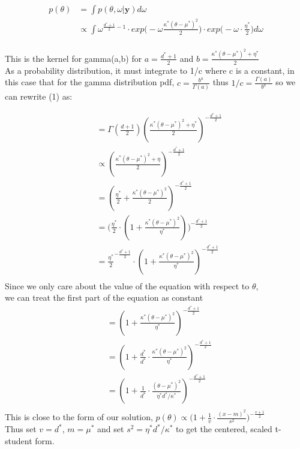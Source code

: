 \documentclass{homework}
\begin{document}
\begin{enumerate}[label=(\Alph*)]
\begin{equation} \begin{split}
p(\theta) & = \int p(\theta, \omega | \textbf{y}) d\omega \\
& \propto \int  \omega^{\frac{d^*+1}{2} - 1 } \cdot exp\big( -\omega \frac{\kappa^*(\theta - \mu^*)^2}{2} \big)  \cdot exp\big( -\omega \cdot \frac{\eta^*}{2}\big) d\omega \\
\end{split} \end{equation}

This is the kernel for gamma(a,b) for $a = \frac{d^* + 1}{2}$ and $b = \frac{\kappa^*(\theta - \mu^*)^2 + \eta^*}{2} $\\ As a probability distribution, it must integrate to 1/c where c is a constant, in this case that for the gamma distribution pdf, $c = \frac{b^a}{\Gamma(a)}$ thus $1/c  =   \frac{\Gamma(a)}{b^a}$ so we can rewrite (1) as:

\begin{equation} \begin{split}
& = \Gamma(\frac{d+1}{2})( \frac{\kappa^*(\theta - \mu^*)^2 + \eta^*}{2} )^{-\frac{d^*+1}{2}} \\
& \propto ( \frac{\kappa^*(\theta - \mu^*)^2 + \eta}{2} )^{-\frac{d^*+1}{2}} \\
& = ( \frac{\eta^*}{2} + \frac{\kappa^*(\theta - \mu^*)^2}{2} )^{-\frac{d^*+1}{2}} \\
& = \big(\frac{\eta^*}{2} \cdot ( 1 + \frac{\kappa^*(\theta - \mu^*)^2}{\eta^*}) \big)^{-\frac{d^*+1}{2}} \\
& = \frac{\eta^*}{2}^{-\frac{d^*+1}{2}} \cdot ( 1 + \frac{\kappa^*(\theta - \mu^*)^2}{\eta^*})^{-\frac{d^*+1}{2}} \\
\end{split} \end{equation}
Since we only care about the value of the equation with respect to $\theta$, \\we can treat the first part of the equation as constant
\begin{equation} \begin{split}
& = ( 1 + \frac{\kappa^*(\theta - \mu^*)^2}{\eta^*})^{-\frac{d^*+1}{2}} \\
& = ( 1 + \frac{d^*}{d^*} \cdot \frac{\kappa^*(\theta - \mu^*)^2}{\eta^*})^{-\frac{d^*+1}{2}} \\
& = ( 1 + \frac{1}{d^*} \cdot \frac{(\theta - \mu^*)^2}{\eta^* d^*/\kappa^*})^{-\frac{d^*+1}{2}} \\
\end{split} \end{equation}
This is close to the form of our solution, $p(\theta) \propto \big( 1 + \frac{1}{v} \cdot \frac{(x-m)^2}{s^2}\big)^{-\frac{v+1}{2}}$\\
Thus set $v = d^*$, $m = \mu^*$ and set $s^2 = \eta^* d^*/\kappa^*$ to get the centered, scaled t-student form.



\end{enumerate}
\end{document}
